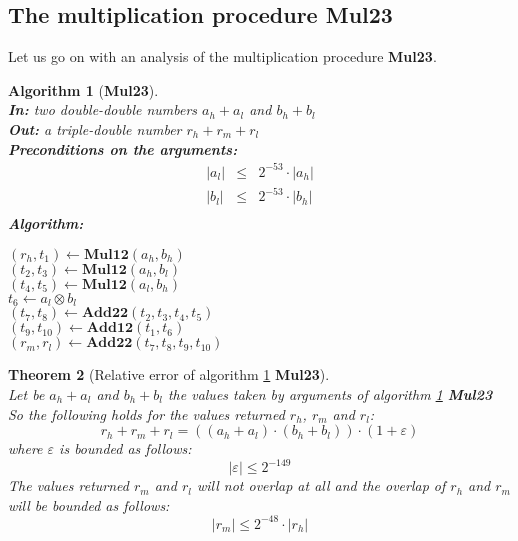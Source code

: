 \documentclass[a4paper,10pt,twoside]{article}
\newtheorem{theorem}{Theorem}[section]
\newtheorem{algorithm}[theorem]{Algorithm}
\newcommand{\hi}{\ensuremath{\mathit{h}}}
\newcommand{\mi}{\ensuremath{\mathit{m}}}
\newcommand{\lo}{\ensuremath{\mathit{l}}}
\newcommand{\MulDT}{{\bf Mul23}}
\newcommand{\mAdd}{\ensuremath{\mathbf{Add12}}}
\newcommand{\mAddDD}{\ensuremath{\mathbf{Add22}}}
\newcommand{\mMul}{\ensuremath{\mathbf{Mul12}}}
\renewcommand{\epsilon}{\varepsilon}
\begin{document}
\subsection{The multiplication procedure \MulDT}
Let us go on with an analysis of the multiplication procedure \MulDT.
\begin{algorithm}[\MulDT] \label{mulDTref} ~ \\
{\bf In:} two double-double numbers $a_\hi + a_\lo$ and $b_\hi + b_\lo$ \\
{\bf Out:} a triple-double number $r_\hi + r_\mi + r_\lo$ \\
{\bf Preconditions on the arguments:}
\begin{eqnarray*}
\left \vert a_\lo \right \vert & \leq & 2^{-53} \cdot \left \vert a_\hi \right \vert \\
\left \vert b_\lo \right \vert & \leq & 2^{-53} \cdot \left \vert b_\hi \right \vert \\
\end{eqnarray*}
{\bf Algorithm:} \\
\begin{center}
\begin{minipage}[b]{50mm}
$\left( r_\hi, t_1 \right) \gets \mMul\left( a_\hi, b_\hi \right)$ \\
$\left( t_2, t_3 \right) \gets \mMul\left( a_\hi, b_\lo \right)$ \\
$\left( t_4, t_5 \right) \gets \mMul\left( a_\lo, b_\hi \right)$ \\
$t_6 \gets a_\lo \otimes b_\lo$ \\
$\left( t_7, t_8 \right) \gets \mAddDD\left( t_2, t_3, t_4, t_5 \right)$ \\
$\left( t_9, t_{10} \right) \gets \mAdd\left( t_1, t_6 \right)$ \\
$\left( r_\mi, r_\lo \right) \gets \mAddDD\left( t_7, t_8, t_9, t_{10} \right)$ \\
\end{minipage}
\end{center}
\end{algorithm}
\begin{theorem}[Relative error of algorithm \ref{mulDTref} \MulDT] ~ \\
Let be $a_\hi + a_\lo$ and $b_\hi + b_\lo$ the values taken by arguments of algorithm \ref{mulDTref} \MulDT \\
So the following holds for the values returned $r_\hi$, $r_\mi$ and $r_\lo$:
$$r_\hi + r_\mi + r_\lo = \left(\left(a_\hi + a_\lo \right) \cdot \left( b_\hi + b_\lo \right)\right) \cdot \left(1 + \epsilon\right)$$
where $\epsilon$ is bounded as follows:
$$\left \vert \epsilon \right \vert \leq 2^{-149}$$
The values returned $r_\mi$ and $r_\lo$ will not overlap at all and the overlap of $r_\hi$ and $r_\mi$ will be bounded as
follows:
$$\left \vert r_\mi \right \vert \leq 2^{-48} \cdot \left \vert r_\hi \right \vert$$
\end{theorem}
\end{document}
